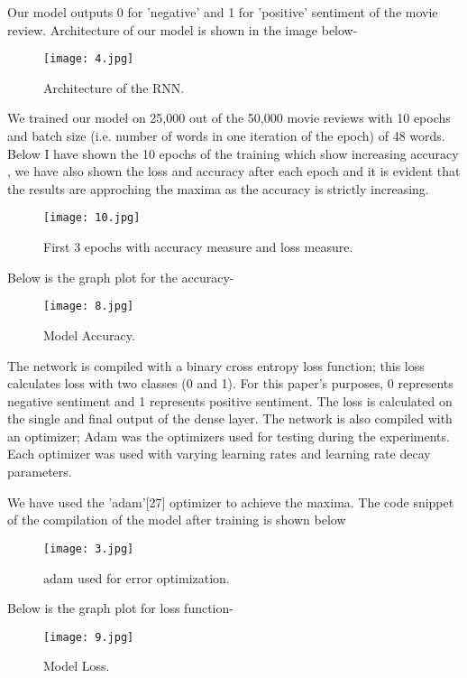 \documentclass[conference]{IEEEtran}
\begin{document}
Our model outputs 0 for 'negative' and 1 for 'positive' sentiment of the movie review. Architecture of our model is shown in the image below-

\begin{figure}[htbp!]
\centerline{\texttt{[image: 4.jpg]}}
\caption{Architecture of the RNN.}
\label{fig}
\end{figure}

We trained our model on 25,000 out of the 50,000 movie reviews with 10 epochs and batch size (i.e. number of words in one iteration of the epoch) of 48 words. Below I have shown the 10 epochs of the training which show increasing accuracy  , we have also shown the loss and accuracy after each epoch and it is evident that the results are approching the maxima as the accuracy is  strictly increasing.

\begin{figure}[htbp!]
\centerline{\texttt{[image: 10.jpg]}}
\caption{First 3 epochs with accuracy measure and loss measure.}
\label{fig}
\end{figure}

Below is the graph plot for the accuracy-

\begin{figure}[htbp!]
\centerline{\texttt{[image: 8.jpg]}}
\caption{Model Accuracy.}
\label{fig}
\end{figure}

The network is compiled with a binary cross entropy loss
function; this loss calculates loss with two classes (0 and 1).
For this paper’s purposes, 0 represents negative sentiment and
1 represents positive sentiment. The loss is calculated on the
single and final output of the dense layer.
The network is also compiled with an optimizer; Adam was the
optimizers used for testing during the experiments. Each
optimizer was used with varying learning rates and learning
rate decay parameters. 


We have used the 'adam'[27] optimizer to achieve the maxima. The code snippet of the compilation of the model after training is shown below

\begin{figure}[htbp!]
\centerline{\texttt{[image: 3.jpg]}}
\caption{adam used for error optimization.}
\label{fig}
\end{figure}

Below is the graph plot for loss function-

\begin{figure}[htbp!]
\centerline{\texttt{[image: 9.jpg]}}
\caption{Model Loss.}
\label{fig}
\end{figure}
\end{document}
